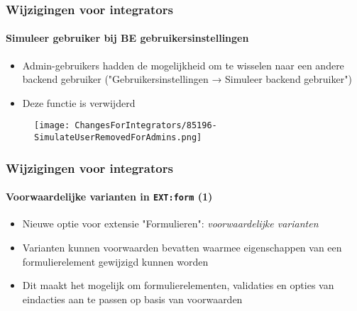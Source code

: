 
\begin{frame}[fragile]
	\frametitle{Wijzigingen voor integrators}
	\framesubtitle{Simuleer gebruiker bij BE gebruikersinstellingen}

	\begin{itemize}
		\item Admin-gebruikers hadden de mogelijkheid om te wisselen naar een andere
			backend gebruiker ("Gebruikersinstellingen → Simuleer backend gebruiker")
		\item Deze functie is verwijderd
	\end{itemize}

	\begin{figure}
		\texttt{[image: ChangesForIntegrators/85196-SimulateUserRemovedForAdmins.png]}
	\end{figure}

\end{frame}


\begin{frame}[fragile]
	\frametitle{Wijzigingen voor integrators}
	\framesubtitle{Voorwaardelijke varianten in \texttt{EXT:form} (1)}

	\begin{itemize}
		\item Nieuwe optie voor extensie "Formulieren": \textit{voorwaardelijke varianten}
		\item Varianten kunnen voorwaarden bevatten waarmee eigenschappen van een formulierelement
			gewijzigd kunnen worden
		\item Dit maakt het mogelijk om formulierelementen, validaties en opties van eindacties aan
			te passen op basis van voorwaarden

	\end{itemize}

\end{frame}


